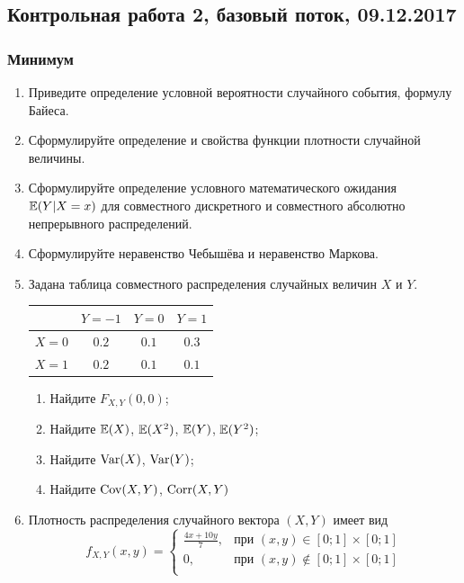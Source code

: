 \subsection{Контрольная работа 2, базовый поток, 09.12.2017}



\subsubsection{Минимум}

\begin{enumerate}
\item Приведите определение условной вероятности случайного события, формулу Байеса.
\item Сформулируйте определение и свойства функции плотности случайной величины. 
\item Сформулируйте определение  условного математического ожидания $\mathbb{E}(Y|X=x)$ для совместного дискретного и совместного абсолютно непрерывного распределений.
\item Сформулируйте неравенство Чебышёва и неравенство Маркова.

\item Задана таблица совместного распределения случайных величин $X$ и $Y$.
\begin{center}
\begin{tabular}{lccc}
\toprule
                       & $Y=-1$  & $Y=0$   & $Y=1$   \\ 
 \midrule
$X=0$                 & $0.2$ & $0.1$ & $0.3$ \\
 $X=1$                 & $0.2$ & $0.1$ & $0.1$ \\ 
 \bottomrule
\end{tabular}
\end{center}


\begin{enumerate}
    \item Найдите $F_{X,Y}(0, 0)$;
    \item Найдите $\mathbb{E}(X)$, $\mathbb{E}(X^2)$, $\mathbb{E}(Y)$, $\mathbb{E}(Y^2)$;
    \item Найдите $\operatorname{Var}(X)$, $\operatorname{Var}(Y)$;
    \item Найдите $\operatorname{Cov}(X, Y)$, $\operatorname{Corr}(X, Y)$
\end{enumerate}    
\item Плотность распределения случайного вектора $(X,Y)$ имеет вид
\[
f_{X,Y}(x,y) = 
\begin{cases} 
\frac{4x+10y}{7}, & \text{при } (x,y) \in [0;1] \times [0;1] \\ 
0 , & \text{при } (x,y) \not\in [0;1] \times [0;1] \\
\end{cases}
\]


\end{enumerate}
